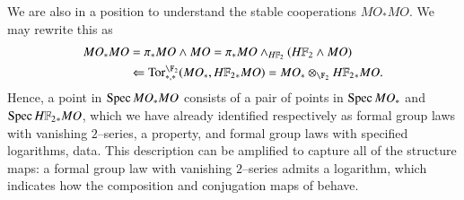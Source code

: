 \begin{remark}
We are also in a position to understand the stable cooperations $MO_* MO$.  We may rewrite this as
\begin{align*}
MO_* MO & = \pi_* MO \sm MO = \pi_* MO \sm_{\HFtwo} (\HFtwo \sm MO) \\
& \Leftarrow \Tor^{\F_2}_{*, *}(MO_*, \HFtwo_* MO) = MO_* \otimes_{\F_2} \HFtwo_* MO.
\end{align*}
Hence, a point in $\operatorname{Spec} MO_* MO$ consists of a pair of points in $\operatorname{Spec} MO_*$ and $\Spec \HFtwo_* MO$, which we have already identified respectively as formal group laws with vanishing $2$--series, a property, and formal group laws with specified logarithms, data.  This description can be amplified to capture all of the structure maps: a formal group law with vanishing $2$--series admits a logarithm, which indicates how the composition and conjugation maps of  behave.
\end{remark}



